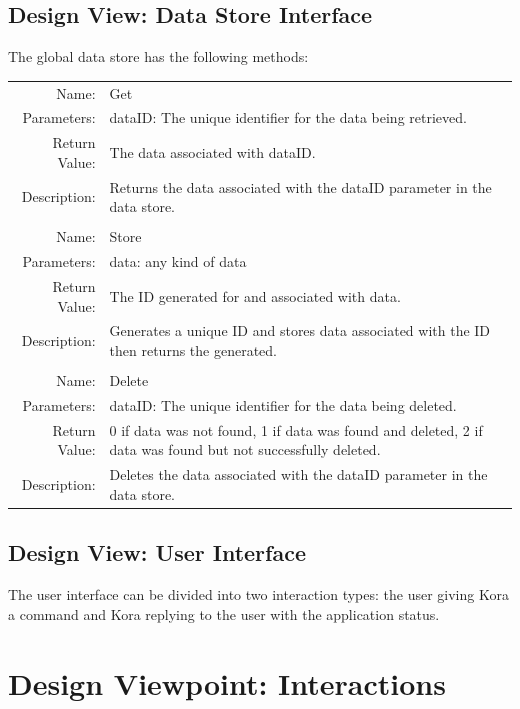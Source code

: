 \documentclass[onecolumn, draftclsnofoot,10pt, compsoc]{IEEEtran}
\def \botname{Kora\xspace}
\begin{document}
    \subsection{Design View: Data Store Interface}
        The global data store has the following methods: \\
        \begin{tabular}[t]{r p{6in}}
            Name: & Get \\
            Parameters: & dataID: The unique identifier for the data being retrieved.\\
            Return Value: & The data associated with dataID.\\
            Description: & Returns the data associated with the dataID parameter in the data store. \\
            & \\
            Name: & Store \\
            Parameters: & data: any kind of data \\
            Return Value: & The ID generated for and associated with data.\\
            Description: & Generates a unique ID and stores data associated with the ID then returns the generated. \\
            & \\
            Name: & Delete \\
            Parameters: & dataID: The unique identifier for the data being deleted.\\
            Return Value: & 0 if data was not found, 1 if data was found and deleted, 2 if data was found but not successfully deleted. \\
            Description: & Deletes the data associated with the dataID parameter in the data store. \\
        \end{tabular}

    \subsection{Design View: User Interface}
        The user interface can be divided into two interaction types: the user giving \botname a command and \botname replying to the user with the application status. 

\section{Design Viewpoint: Interactions}
\end{document}
